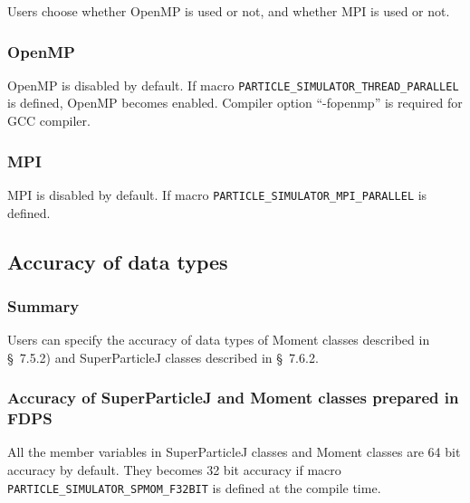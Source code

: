 Users choose whether OpenMP is used or not, and whether MPI is used or not.

\subsubsection{OpenMP}

OpenMP is disabled by default. If macro
\texttt{PARTICLE\_SIMULATOR\_THREAD\_PARALLEL} is defined, OpenMP becomes
enabled. Compiler option ``-fopenmp'' is required for GCC compiler.

\subsubsection{MPI}

MPI is disabled by default. If macro
\texttt{PARTICLE\_SIMULATOR\_MPI\_PARALLEL} is defined.

\subsection{Accuracy of data types}

\subsubsection{Summary}
Users can specify the accuracy of data types of Moment classes described in \S~7.5.2) and SuperParticleJ classes described in \S~7.6.2.

\subsubsection{Accuracy of SuperParticleJ and Moment classes prepared in FDPS}
All the member variables in SuperParticleJ classes and Moment classes are 64 bit accuracy by default. They becomes 32 bit accuracy if macro \texttt{PARTICLE\_SIMULATOR\_SPMOM\_F32BIT} is defined at the compile time.

